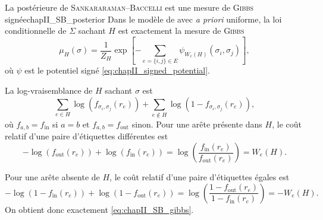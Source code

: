 \begin{Fait}{La postérieure de \textsc{Sankararaman--Baccelli} est une mesure de \textsc{Gibbs} signée}{chapII_SB_posterior}
Dans le modèle de \SB{} avec \emph{a priori} uniforme, la loi conditionnelle de $\Sigma$ sachant $H$ est exactement la mesure de \textsc{Gibbs}
\begin{equation}
    \mu_H(\sigma)
    =
    \frac1{Z_H}
    \exp\left[-\sum_{e=\{i,j\}\in E}\psi_{W_e(H)}(\sigma_i,\sigma_j)\right],
    \label{eq:chapII_SB_gibbs}
\end{equation}
où $\psi$ est le potentiel signé \eqref{eq:chapII_signed_potential}.
\end{Fait}

\begin{Preuve}
La log-vraisemblance de $H$ sachant $\sigma$ est
\[
    \sum_{e\in H} \log\left(f_{\sigma_i,\sigma_j}(r_e)\right)
    +\sum_{e\notin H}\log \left(1-f_{\sigma_i,\sigma_j}(r_e)\right),
\]
où $f_{a,b}=f_{\mathrm{in}}$ si $a=b$ et $f_{a,b}=f_{\mathrm{out}}$ sinon. 
Pour une arête présente dans $H$, le coût relatif d'une paire d'étiquettes différentes est
\[
    -\log \left(f_{\mathrm{out}} (r_e)\right)
    + \log \left(f_{\mathrm{in}} (r_e)\right)
    =
    \log\left(\frac{f_{\mathrm{in}}(r_e)}{f_{\mathrm{out}}(r_e)}\right)
    =
    W_e(H).
\]

Pour une arête absente de $H$, le coût relatif d'une paire d'étiquettes égales est
\[
    -\log \left(1-f_{\mathrm{in}} (r_e)\right)
    + \log \left(1-f_{\mathrm{out}} (r_e)\right)
    =
    \log\left(\frac{1-f_{\mathrm{out}}(r_e)}{1-f_{\mathrm{in}}(r_e)}\right)
    =
    -W_e(H).
\]
On obtient donc exactement \eqref{eq:chapII_SB_gibbs}.
\end{Preuve}


